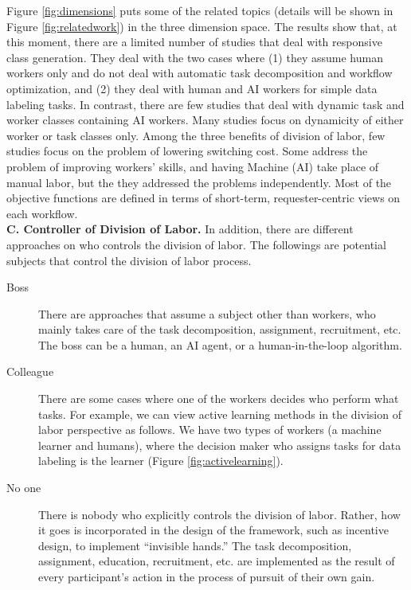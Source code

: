 Figure \ref{fig:dimensions} puts some of the related topics (details will be shown in Figure \ref{fig:relatedwork}) in the three dimension space. 
The results show that, at this moment, there are a limited number of studies that deal with  responsive class generation. They deal with the two cases where (1) they assume human workers only and do not deal with automatic task decomposition and workflow optimization, and (2) they deal with human and AI workers for simple data labeling tasks. In contrast, there are few studies that deal with dynamic task and worker classes containing AI workers. Many studies focus on dynamicity of either worker or  task classes only.
Among the three benefits of division of labor, few studies focus on the problem of lowering switching cost. Some address the problem of improving workers' skills, and having Machine (AI) take place of manual labor, but the they addressed the problems independently.
Most of the objective functions are defined in terms of short-term, requester-centric views on each workflow.\\


\noindent
{\bf C. Controller of Division of Labor.}
In addition, there are different approaches on who controls the division of labor. 
The followings are potential subjects that  control the division of labor process.
\begin{description}
\item[Boss] There are approaches that assume a subject other than workers, who mainly takes care of the task decomposition, assignment, recruitment, etc. The boss can be a human, an AI agent, or a human-in-the-loop algorithm.
\item[Colleague] There are some cases where one of the workers decides who perform what tasks.
For example, we can view active learning methods in the division of labor perspective as follows. We have two types of workers (a machine learner and humans), where the decision maker who assigns tasks for data labeling is the learner (Figure \ref{fig:activelearning}).
\item[No one] There is nobody who explicitly controls  the division of labor. Rather, how it goes is incorporated in the design of the framework, such as incentive design, to implement ``invisible hands.'' 
The task decomposition, assignment, education, recruitment, etc. are implemented as the result of every participant's action in the process of pursuit of their own gain.
\end{description}







